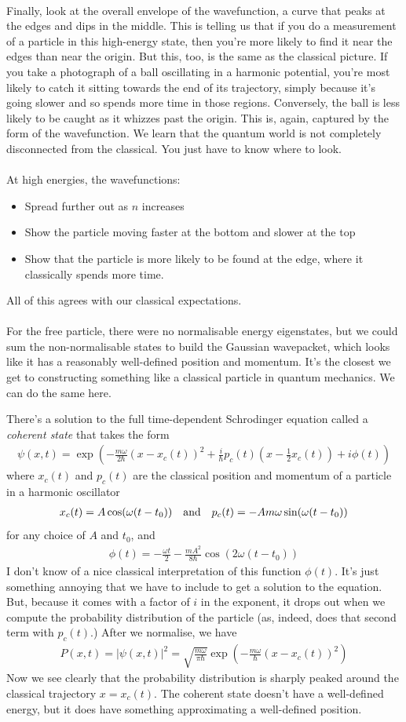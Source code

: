 \documentclass[12pt]{article}
\def\be{\begin{eqnarray}}
\def\ee{\end{eqnarray}}
\newcommand{\nn}{\nonumber}
\newcommand\para{\paragraph{}}
\newcommand{\ft}[2]{{\textstyle\frac{#1}{#2}}}
\newcommand{\co}{\color{olive}}
\begin{document}
\para
Finally, look at the overall envelope of the wavefunction, a curve that peaks at the edges and dips in the middle.  This is telling us that if you do a measurement of a particle in this high-energy state, then you're more likely to find it near the edges than near the origin. But this, too, is the same as the classical picture. If you take a photograph of a ball oscillating in a harmonic potential, you're most likely to catch it sitting towards the end of its trajectory, simply because it's going slower and so spends more time in those regions. Conversely, the ball is less likely to be caught as it whizzes past the origin.  This is, again, captured by the form of the wavefunction. 
We learn that the quantum world is not completely disconnected from the classical. You just have to know where to look.

\para
{\co 
At high energies, the wavefunctions:
\begin{itemize}
\item Spread further out as $n$ increases
\item Show the particle moving faster at the bottom and slower at the top
\item Show that the particle is more likely to be found at the edge, where it classically spends more time.
 \end{itemize}
All of this agrees with our classical expectations.}

\para
For the free particle, there were no normalisable energy eigenstates, but we could sum the non-normalisable states to build the Gaussian wavepacket, which looks like it has a reasonably well-defined position and momentum. It's the closest we get to constructing something like a classical particle in quantum mechanics. We can do the same here. 


{\co
There's a solution to the full time-dependent Schrodinger equation called a {\it coherent state} that takes the form
%
\be \psi(x,t) = \exp\left(-\frac{m\omega}{2\hbar}(x-x_c(t))^2 + \frac{i}{\hbar}p_c(t)(x-\ft12 x_c(t)) + i\phi(t)\right)\nn\ee
%
where $x_c(t)$ and $p_c(t)$ are the classical position and momentum of a particle in a harmonic oscillator
%
\be x_c(t) = A\cos(\omega(t-t_0)) \ \ \ {\rm and}\ \ \ p_c(t) = -Am\omega \sin(\omega(t-t_0))\nn\ee
%
for any choice of $A$ and $t_0$, and
%
\be \phi(t) = -\frac{\omega t}{2} - \frac{mA^2}{8\hbar} \cos(2\omega(t-t_0))\nn\ee
%
} I don't know of a nice classical interpretation of this function $\phi(t)$. It's just something annoying that we have to include to get a solution to the equation. But, because it comes with a factor of $i$ in the exponent, it drops out when we compute the probability distribution of the particle (as, indeed, does that second term with $p_c(t)$.) {\co After we normalise, we have
%
\be P(x,t) = |\psi(x,t)|^2 = \sqrt{\frac{m\omega}{\pi\hbar}}\exp\left(-\frac{m\omega}{\hbar}(x-x_c(t))^2\right)\nn\ee
%
} Now we see clearly that the probability distribution is sharply peaked around the classical trajectory $x=x_c(t)$. The coherent state doesn't have a well-defined energy, but it does have something approximating a well-defined position. 
\end{document}
